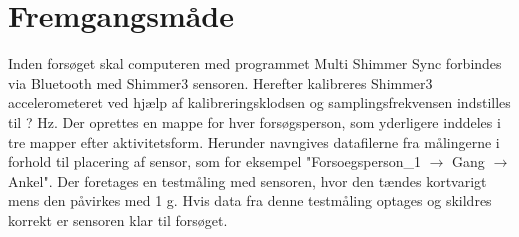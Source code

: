\section{Fremgangsmåde}
Inden forsøget skal computeren med programmet Multi Shimmer Sync forbindes via Bluetooth med Shimmer3 sensoren. Herefter kalibreres Shimmer3 accelerometeret ved hjælp af kalibreringsklodsen og samplingsfrekvensen indstilles til ? Hz. %
Der oprettes en mappe for hver forsøgsperson, som yderligere inddeles i tre mapper efter aktivitetsform. Herunder navngives datafilerne fra målingerne i forhold til placering af sensor, som for eksempel "Forsoegsperson\_1 $\rightarrow$ Gang $\rightarrow$ Ankel".
Der foretages en testmåling med sensoren, hvor den tændes kortvarigt mens den påvirkes med 1 g. Hvis data fra denne testmåling optages og skildres korrekt er sensoren klar til forsøget.

